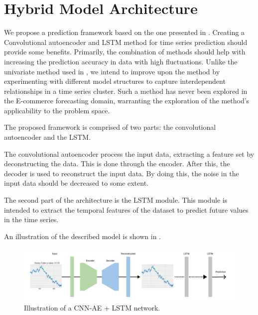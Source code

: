 \section{Hybrid Model Architecture}
\label{section:Architecture:Model}

We propose a prediction framework based on the one presented in \cite{Zhao2019}.
Creating a Convolutional autoencoder and LSTM method for time series prediction should provide some benefits.
Primarily, the combination of methods should help with increasing the prediction accuracy in data with high fluctuations.
Unlike the univariate method used in \cite{Zhao2019},
we intend to improve upon the method by experimenting with different model structures to capture interdependent relationships in a time series cluster.
Such a method has never been explored in the E-commerce forecasting domain, warranting the exploration of the method's applicability to the problem space.

The proposed framework is comprised of two parts: the convolutional autoencoder and the LSTM.

The convolutional autoencoder process the input data, extracting a feature set by deconstructing the data.
This is done through the encoder. After this, the decoder is used to reconstruct the input data.
By doing this, the noise in the input data should be decreased to some extent.

The second part of the architecture is the LSTM module.
This module is intended to extract the temporal features of the dataset
to predict future values in the time series.

An illustration of the described model is shown in .

\begin{figure}[h!]
  \centering
  \includegraphics[width=\textwidth]{./figs/illustrations/CNN-AE-LSTM.png}
  \hfill
  \caption{Illustration of a CNN-AE + LSTM network.}
  \label{fig:cnn-ae+lstm-network}
\end{figure}

